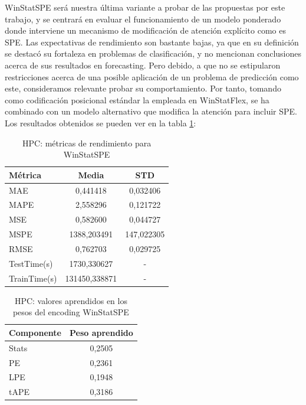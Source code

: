 WinStatSPE será nuestra última variante a probar de las propuestas por este trabajo, y se centrará en evaluar el funcionamiento de un modelo ponderado donde interviene un mecanismo de modificación de atención explícito como es SPE. Las expectativas de rendimiento son bastante bajas, ya que en su definición se destacó su fortaleza en problemas de clasificación, y no mencionan conclusiones acerca de sus resultados en forecasting. Pero debido, a que no se estipularon restricciones acerca de una posible aplicación de un problema de predicción como este, consideramos relevante probar su comportamiento. Por tanto, tomando como codificación posicional estándar la empleada en WinStatFlex, se ha combinado con un modelo alternativo que modifica la atención para incluir SPE. Los resultados obtenidos se pueden ver en la tabla \ref{hpcspe}:
\begin{table}[!ht]
	\centering
	\begin{tabular}{l|c|c}
		\toprule
		Métrica & Media & STD \\
		\midrule
		MAE & 0,441418 & 0,032406 \\
		MAPE & 2,558296 & 0,121722 \\
		MSE & 0,582600 & 0,044727 \\
		MSPE & 1388,203491 & 147,022305 \\
		RMSE & 0,762703 & 0,029725 \\
		TestTime(s) & 1730,330627 & - \\
		TrainTime(s) & 131450,338871 & - \\
		\bottomrule
	\end{tabular}
	\caption{HPC: métricas de rendimiento para WinStatSPE}
\label{hpcspe}
\end{table}


\begin{table}[!ht]
	\centering
	\begin{tabular}{l|c}
		\toprule
		Componente & Peso aprendido \\
		\midrule
		Stats &0,2505 \\
		PE & 0,2361 \\
		LPE &  0,1948 \\
		tAPE &  0,3186 \\
		\bottomrule
	\end{tabular}
	\caption{HPC: valores aprendidos en los pesos del encoding WinStatSPE}
	\label{hpcspepesos}
\end{table}

